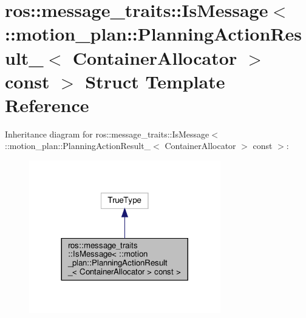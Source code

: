 \hypertarget{structros_1_1message__traits_1_1IsMessage_3_01_1_1motion__plan_1_1PlanningActionResult___3_01Cone618348b0fc4b8ab6edab42111e903fc}{}\section{ros\+:\+:message\+\_\+traits\+:\+:Is\+Message$<$ \+:\+:motion\+\_\+plan\+:\+:Planning\+Action\+Result\+\_\+$<$ Container\+Allocator $>$ const $>$ Struct Template Reference}
\label{structros_1_1message__traits_1_1IsMessage_3_01_1_1motion__plan_1_1PlanningActionResult___3_01Cone618348b0fc4b8ab6edab42111e903fc}


Inheritance diagram for ros\+:\+:message\+\_\+traits\+:\+:Is\+Message$<$ \+:\+:motion\+\_\+plan\+:\+:Planning\+Action\+Result\+\_\+$<$ Container\+Allocator $>$ const $>$\+:
\nopagebreak
\begin{figure}[H]
\begin{center}
\leavevmode
\includegraphics[width=236pt]{structros_1_1message__traits_1_1IsMessage_3_01_1_1motion__plan_1_1PlanningActionResult___3_01Con3a06eefa6f504320a630ba172f143f2d}
\end{center}
\end{figure}


